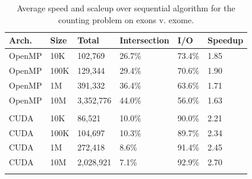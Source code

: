 \documentclass{bioinfo}
\begin{document}
        \begin{table}[h]
        \centering
        \begin{center}
                \begin{tabular}{l l l l l l}
                        Arch. & Size & Total & Intersection & I/O & Speedup \\
                        \hline
                        \hline
                        OpenMP & 10K & 102,769 & 26.7\% & 73.4\% & 1.85 \\
                        OpenMP & 100K & 129,344 & 29.4\% & 70.6\% & 1.90 \\
                        OpenMP & 1M & 391,332 & 36.4\% & 63.6\% & 1.71 \\
                        OpenMP & 10M & 3,352,776 & 44.0\% & 56.0\% & 1.63 \\ 
                        \\
                        CUDA & 10K & 86,521 & 10.0\% & 90.0\% & 2.21 \\
                        CUDA & 100K & 104,697 & 10.3\% & 89.7\% & 2.34 \\
                        CUDA & 1M & 272,418 & 8.6\% & 91.4\% & 2.45 \\
                        CUDA & 10M & 2,028,921 & 7.1\% & 92.9\% & 2.70 \\
                        \\
                \end{tabular}
        \end{center}
        \label{table:avge}
        \caption{Average speed and scaleup over sequential algorithm for the counting problem on exons v. exome.}
        \end{table}
        
\end{document}
